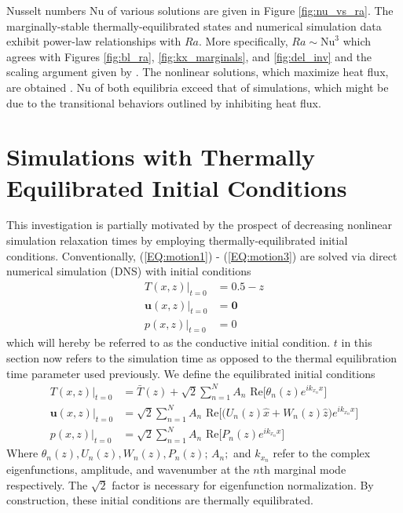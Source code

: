 \documentclass[reprint,amsmath,amssymb,aps]{revtex4-1}
\newcommand\Nu{\mathrm{Nu}}
\begin{document}
Nusselt numbers $\Nu$ of various solutions are given in Figure \ref{fig:nu_vs_ra}. 
The marginally-stable thermally-equilibrated states and numerical simulation data exhibit power-law relationships with $Ra$. 
More specifically, $Ra \sim \Nu^3$ which agrees with Figures \ref{fig:bl_ra}, \ref{fig:kx_marginals}, and \ref{fig:del_inv} and the scaling argument given by \cite{Malkus}. 
The nonlinear solutions, which maximize heat flux, are obtained \cite{Waleffe}. 
$\Nu$ of both equilibria exceed that of simulations, which might be due to the transitional behaviors outlined by \cite{Yalniz} inhibiting heat flux.

\section{Simulations with Thermally Equilibrated Initial Conditions}
This investigation is partially motivated by the prospect of decreasing nonlinear simulation relaxation times by employing thermally-equilibrated initial conditions. 
Conventionally, (\ref{EQ:motion1}) - (\ref{EQ:motion3}) are solved via direct numerical simulation (DNS) with initial conditions
\begin{align}
    T(x, z)\big|_{t=0} &= 0.5 - z \\
    \mathbf{u}(x, z)\big|_{t=0} &= \mathbf{0} \\
    p(x, z)\big|_{t=0} &= 0
\end{align}
which will hereby be referred to as the conductive initial condition. 
$t$ in this section now refers to the simulation time as opposed to the thermal equilibration time parameter used previously. 
We define the equilibrated initial conditions
\begin{align}
    T(x, z)\big|_{t=0} &= \bar{T}(z) + \sqrt{2} \sum_{n=1}^N  A_n \text{ Re} \Big[ \theta_n(z) e^{ik_{x_n}x} \Big] \nonumber \\
    \mathbf{u}(x, z)\big|_{t=0} &= \sqrt{2} \sum_{n=1}^N A_n \text{ Re} \Big[\Big( U_n (z) \hat{x} + W_n(z) \hat{z} \Big) e^{ik_{x_n}x} \Big] \nonumber\\
    p(x, z)\big|_{t=0} &= \sqrt{2} \sum_{n=1}^N A_n \text{ Re} \Big[P_n (z) e^{ik_{x_n}x}\Big]
\end{align}
Where $\theta_n(z), U_n(z), W_n(z), P_n(z); \, A_n; $ and $k_{x_n}$ refer to the complex eigenfunctions, amplitude, and wavenumber at the $n$th marginal mode respectively. 
The $\sqrt{2}$ factor is necessary for eigenfunction normalization. 
By construction, these initial conditions are thermally equilibrated. 
\end{document}
